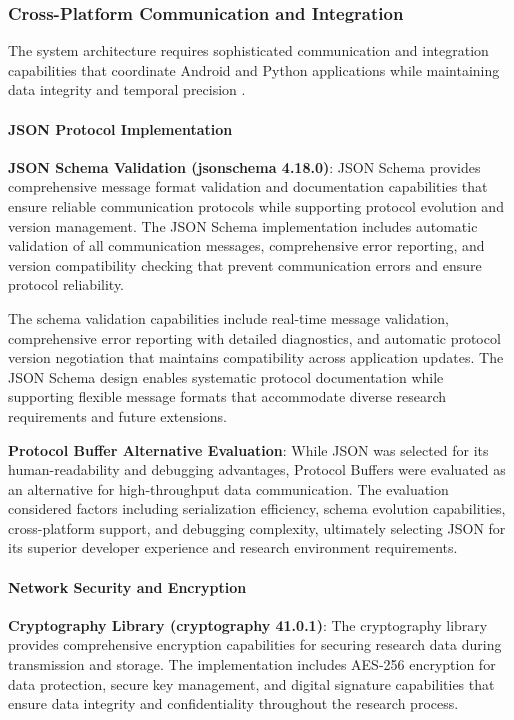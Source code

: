 \documentclass[11pt,a4paper]{article}
\begin{document}
\subsubsection{Cross-Platform Communication and Integration}

The system architecture requires sophisticated communication and integration capabilities that coordinate Android and
Python applications while maintaining data integrity and temporal precision .

\paragraph{JSON Protocol Implementation}

\textbf{JSON Schema Validation (jsonschema 4.18.0)}: JSON Schema provides comprehensive message format validation and
documentation capabilities that ensure reliable communication protocols while supporting protocol evolution and version
management. The JSON Schema implementation includes automatic validation of all communication messages, comprehensive
error reporting, and version compatibility checking that prevent communication errors and ensure protocol reliability.

The schema validation capabilities include real-time message validation, comprehensive error reporting with detailed
diagnostics, and automatic protocol version negotiation that maintains compatibility across application updates. The
JSON Schema design enables systematic protocol documentation while supporting flexible message formats that accommodate
diverse research requirements and future extensions.

\textbf{Protocol Buffer Alternative Evaluation}: While JSON was selected for its human-readability and debugging advantages,
Protocol Buffers were evaluated as an alternative for high-throughput data communication. The evaluation considered
factors including serialization efficiency, schema evolution capabilities, cross-platform support, and debugging
complexity, ultimately selecting JSON for its superior developer experience and research environment requirements.

\paragraph{Network Security and Encryption}

\textbf{Cryptography Library (cryptography 41.0.1)}: The cryptography library provides comprehensive encryption capabilities
for securing research data during transmission and storage. The implementation includes AES-256 encryption for data
protection, secure key management, and digital signature capabilities that ensure data integrity and confidentiality
throughout the research process.
\end{document}
